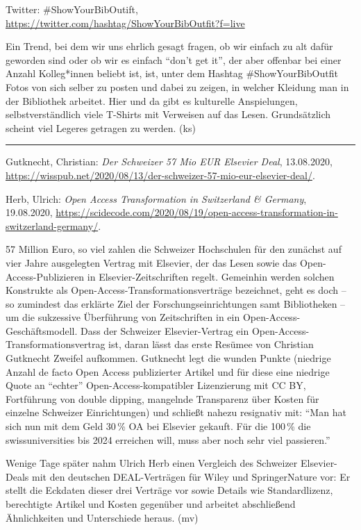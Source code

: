 \documentclass[a4paper,
fontsize=11pt,
oneside,
numbers=noperiodatend,
parskip=half-,
bibliography=totoc,
final
]{scrartcl}
\begin{document}
Twitter: \#ShowYourBibOutift,
\url{https://twitter.com/hashtag/ShowYourBibOutfit?f=live}

Ein Trend, bei dem wir uns ehrlich gesagt fragen, ob wir einfach zu alt
dafür geworden sind oder ob wir es einfach \enquote{don't get it}, der
aber offenbar bei einer Anzahl Kolleg*innen beliebt ist, ist, unter dem
Hashtag \#ShowYourBibOutfit Fotos von sich selber zu posten und dabei zu
zeigen, in welcher Kleidung man in der Bibliothek arbeitet. Hier und da
gibt es kulturelle Anspielungen, selbstverständlich viele T-Shirts mit
Verweisen auf das Lesen. Grundsätzlich scheint viel Legeres getragen zu
werden. (ks)

\begin{center}\rule{0.5\linewidth}{0.5pt}\end{center}

Gutknecht, Christian: \emph{Der Schweizer 57 Mio EUR Elsevier Deal},
13.08.2020,
\url{https://wisspub.net/2020/08/13/der-schweizer-57-mio-eur-elsevier-deal/}.

Herb, Ulrich: \emph{Open Access Transformation in Switzerland \&
Germany}, 19.08.2020,
\url{https://scidecode.com/2020/08/19/open-access-transformation-in-switzerland-germany/}.

57 Million Euro, so viel zahlen die Schweizer Hochschulen für den
zunächst auf vier Jahre ausgelegten Vertrag mit Elsevier, der das Lesen
sowie das Open-Access-Publizieren in Elsevier-Zeitschriften regelt.
Gemeinhin werden solchen Konstrukte als
Open-Access-Transformations\-ver\-träge bezeichnet, geht es doch -- so
zumindest das erklärte Ziel der Forschungseinrichtungen samt
Bibliotheken -- um die sukzessive Überführung von Zeitschriften in ein
Open-Access-Geschäftsmo\-dell. Dass der Schweizer Elsevier-Vertrag ein
Open-Access-Transformationsvertrag ist, daran lässt das erste Resümee
von Christian Gutknecht Zweifel aufkommen. Gutknecht legt die wunden
Punkte (niedrige Anzahl de facto Open Access publizierter Artikel und
für diese eine niedrige Quote an \enquote{echter}
Open-Access-kompatibler Lizenzierung mit CC BY, Fortführung von double
dipping, mangelnde Transparenz über Kosten für einzelne Schweizer
Einrichtungen) und schließt nahezu resignativ mit: \enquote{Man hat sich
nun mit dem Geld 30\,\% OA bei Elsevier gekauft. Für die 100\,\% die
swissuniversities bis 2024 erreichen will, muss aber noch sehr viel
passieren.}

Wenige Tage später nahm Ulrich Herb einen Vergleich des Schweizer
Elsevier-Deals mit den deutschen DEAL-Verträgen für Wiley und
SpringerNature vor: Er stellt die Eckdaten dieser drei Verträge vor
sowie Details wie Standardlizenz, berechtigte Artikel und Kosten
gegenüber und arbeitet abschließend Ähnlichkeiten und Unterschiede
heraus. (mv)
\end{document}
